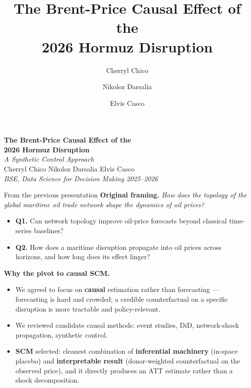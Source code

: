 \documentclass[aspectratio=169,11pt]{beamer}
\title{The Brent-Price Causal Effect of the\\ 2026 Hormuz Disruption}
\subtitle{ }
\author{Cherryl Chico \and Nikoloz Darsalia \and Elvis Casco}
\institute{BSE, Data Science for Decision Making 2025--2026}
\date{}
\newcommand{\hd}[1]{\textbf{#1}}
\begin{document}
{
\begin{frame}[plain]
  \vfill
  \begin{center}
    {\LARGE\bfseries The Brent-Price Causal Effect of the\\[0.2em] 2026 Hormuz Disruption}\\[0.8em]
    {\large\itshape A Synthetic Control Approach}\\[2.5em]
    {\normalsize Cherryl Chico \quad Nikoloz Darsalia \quad Elvis Casco}\\[0.3em]
    {\small\itshape\textcolor{muted}{BSE, Data Science for Decision Making 2025--2026}}
  \end{center}
  \vfill
\end{frame}
}


\begin{frame}{From the previous presentation}
  \footnotesize
  \hd{Original framing.} \emph{How does the topology of the global maritime oil trade network shape the dynamics of oil prices?}
  \begin{itemize}\setlength\itemsep{0.1em}
    \item \hd{Q1.} Can network topology improve oil-price forecasts beyond classical time-series baselines?
    \item \hd{Q2.} How does a maritime disruption propagate into oil prices across horizons, and how long does its effect linger?
  \end{itemize}

  \vspace{0.6em}
  \hd{Why the pivot to causal SCM.}
  \begin{itemize}\setlength\itemsep{0.1em}
    \item We agreed to focus on \hd{causal} estimation rather than forecasting --- forecasting is hard and crowded; a credible counterfactual on a specific disruption is more tractable and policy-relevant.
    \item We reviewed candidate causal methods: event studies, DiD, network-shock propagation, synthetic control.
    \item \hd{SCM} selected: cleanest combination of \hd{inferential machinery} (in-space placebo) and \hd{interpretable result} (donor-weighted counterfactual on the observed price), and it directly produces an ATT estimate rather than a shock decomposition.
  \end{itemize}
  \normalsize
\end{frame}
\end{document}
